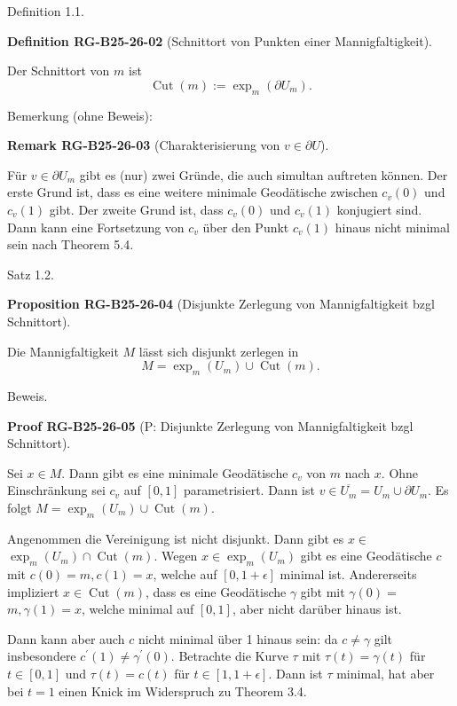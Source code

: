 \documentclass[10pt, letterpaper]{article}
\newcommand{\CustomHeading}[3]{%
  \par\medskip\noindent%
  \textbf{#1 #2} \textnormal{(#3)}.\enskip%
}
\newenvironment{DEF}[2]{\begin{unitbox}\CustomHeading{Definition}{#1}{#2}}{\end{unitbox}}
\newenvironment{PROP}[2]{\begin{unitbox}\CustomHeading{Proposition}{#1}{#2}}{\end{unitbox}}
\newenvironment{REM}[2]{\begin{unitbox}\CustomHeading{Remark}{#1}{#2}}{\end{unitbox}}
\newenvironment{PROOF}[2]{\begin{unitbox}\CustomHeading{Proof}{#1}{#2}}{\end{unitbox}}
\begin{document}
Definition 1.1. 


\begin{DEF}{RG-B25-26-02}{Schnittort von Punkten einer Mannigfaltigkeit}
Der Schnittort von $m$ ist
$$
\operatorname{Cut}(m):=\exp _{m}\left(\partial U_{m}\right) .
$$
\end{DEF}

Bemerkung (ohne Beweis): 


\begin{REM}{RG-B25-26-03}{Charakterisierung von $v\in\partial U$}
Für $v \in \partial U_{m}$ gibt es (nur) zwei Gründe, die auch simultan auftreten können. Der erste Grund ist, dass es eine weitere minimale Geodätische zwischen $c_{v}(0)$ und $c_{v}(1)$ gibt. Der zweite Grund ist, dass $c_{v}(0)$ und $c_{v}(1)$ konjugiert sind. Dann kann eine Fortsetzung von $c_{v}$ über den Punkt $c_{v}(1)$ hinaus nicht minimal sein nach Theorem 5.4.
\end{REM}

Satz 1.2. 


\begin{PROP}{RG-B25-26-04}{Disjunkte Zerlegung von Mannigfaltigkeit bzgl Schnittort}
Die Mannigfaltigkeit $M$ lässt sich disjunkt zerlegen in
$$
M=\exp _{m}\left(U_{m}\right) \cup \operatorname{Cut}(m) .
$$
\end{PROP}

Beweis. 


\begin{PROOF}{RG-B25-26-05}{P: Disjunkte Zerlegung von Mannigfaltigkeit bzgl Schnittort}
Sei $x \in M$. Dann gibt es eine minimale Geodätische $c_{v}$ von $m$ nach $x$. Ohne Einschränkung sei $c_{v}$ auf $[0,1]$ parametrisiert. Dann ist $v \in \overline{U_{m}}=U_{m} \cup \partial U_{m}$. Es folgt $M=\exp _{m}\left(U_{m}\right) \cup \operatorname{Cut}(m)$.

Angenommen die Vereinigung ist nicht disjunkt. Dann gibt es $x \in$ $\exp _{m}\left(U_{m}\right) \cap \operatorname{Cut}(m)$. Wegen $x \in \exp _{m}\left(U_{m}\right)$ gibt es eine Geodätische $c$ mit $c(0)=m, c(1)=x$, welche auf $[0,1+\epsilon]$ minimal ist. Andererseits impliziert $x \in \operatorname{Cut}(m)$, dass es eine Geodätische $\gamma$ gibt mit $\gamma(0)=$ $m, \gamma(1)=x$, welche minimal auf $[0,1]$, aber nicht darüber hinaus ist.

Dann kann aber auch $c$ nicht minimal über 1 hinaus sein: da $c \neq \gamma$ gilt insbesondere $c^{\prime}(1) \neq \gamma^{\prime}(0)$. Betrachte die Kurve $\tau$ mit $\tau(t)=\gamma(t)$ für $t \in[0,1]$ und $\tau(t)=c(t)$ für $t \in[1,1+\epsilon]$. Dann ist $\tau$ minimal, hat aber bei $t=1$ einen Knick im Widerspruch zu Theorem 3.4.
\end{PROOF}
\end{document}
